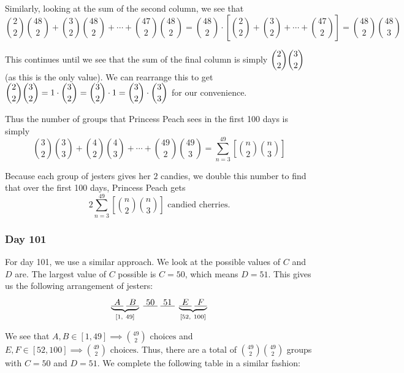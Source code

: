 \documentclass[12pt]{article}
\begin{document}
\begin{solution}{4}
    Similarly, looking at the sum of the second column, we see that
    \begin{equation*}
        \binom22\binom{48}2 + \binom32\binom{48}2 + \cdots + \binom{47}2\binom{48}2
         = \binom{48}2\cdot\left[\binom22+\binom32+\cdots+\binom{47}2\right]
         = \binom{48}2\binom{48}3
    \end{equation*}
    
    This continues until we see that the sum of the final column is simply $\dbinom22\dbinom32$
    (as this is the only value). We can rearrange this to get
    $\dbinom22\dbinom32 = 1\cdot\dbinom32= \dbinom32 \cdot1 = \dbinom32\cdot\dbinom33$ for our convenience.

    Thus the number of groups that Princess Peach sees in the first 100 days is simply
    \begin{equation*}
        \binom32\binom33 + \binom42\binom43 + \cdots + \binom{49}2\binom{49}3
        = \sum_{n=3}^{49}\left[\binom n2\binom n3\right]
    \end{equation*}

    Because each group of jesters gives her $2$ candies, we double this number to find that over the first 100 days,
    Princess Peach gets
    \begin{equation*}
        2\sum_{n=3}^{49} \left[\binom n2\binom n3\right] \text{ candied cherries.}
    \end{equation*}

    \subsubsection*{Day 101}

    For day 101, we use a similar approach. We look at the possible values of $C$ and $D$ are.
    The largest value of $C$ possible is $C=50$, which means $D=51$. This gives us the following arrangement of jesters:
    \begin{equation*}
        \jester {50}{51}{1}{49}{52}{100}
    \end{equation*}
    
    We see that $A, B \in [1, 49] \implies \binom{49}2\text{ choices}$ and $E, F \in [52, 100] \implies
    \binom{49}2\text{ choices}$. Thus, there are a total of $\binom{49}2\binom{49}2$ groups with $C=50$
    and $D=51$. We complete the following table in a similar fashion:
    

\end{solution}
\end{document}
